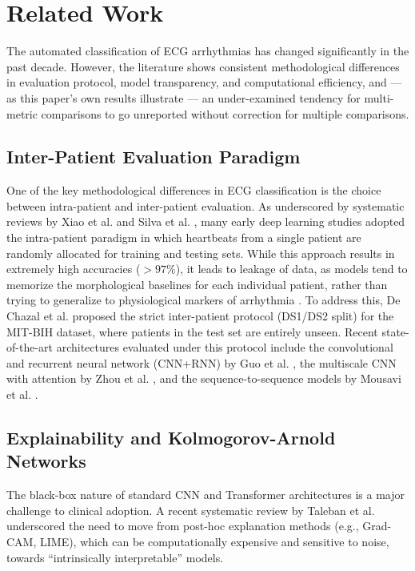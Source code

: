 \documentclass[journal,twoside,web]{ieeecolor}
\begin{document}
\section{Related Work}
\label{sec:related_work}

The automated classification of ECG arrhythmias has changed significantly in the past decade. However, the literature shows consistent methodological differences in evaluation protocol, model transparency, and computational efficiency, and --- as this paper's own results illustrate --- an under-examined tendency for multi-metric comparisons to go unreported without correction for multiple comparisons.

\subsection{Inter-Patient Evaluation Paradigm}
One of the key methodological differences in ECG classification is the choice between intra-patient and inter-patient evaluation. As underscored by systematic reviews by Xiao et al. \cite{xiao_deep_2023} and Silva et al. \cite{silva_systematic_2025}, many early deep learning studies adopted the intra-patient paradigm in which heartbeats from a single patient are randomly allocated for training and testing sets. While this approach results in extremely high accuracies ($> 97\%$), it leads to leakage of data, as models tend to memorize the morphological baselines for each individual patient, rather than trying to generalize to physiological markers of arrhythmia \cite{bahrami_investigation_2025}. To address this, De Chazal et al. \cite{chazal_automatic_2004} proposed the strict inter-patient protocol (DS1/DS2 split) for the MIT-BIH dataset, where patients in the test set are entirely unseen. Recent state-of-the-art architectures evaluated under this protocol include the convolutional and recurrent neural network (CNN+RNN) by Guo et al. \cite{guo_inter-patient_2019}, the multiscale CNN with attention by Zhou et al. \cite{zhou_inter-patient_2024}, and the sequence-to-sequence models by Mousavi et al. \cite{mousavi_inter-_2019}.

\subsection{Explainability and Kolmogorov-Arnold Networks}
The black-box nature of standard CNN and Transformer architectures is a major challenge to clinical adoption. A recent systematic review by Taleban et al. \cite{taleban_explainable_2026} underscored the need to move from post-hoc explanation methods (e.g., Grad-CAM, LIME), which can be computationally expensive and sensitive to noise, towards ``intrinsically interpretable'' models.
\end{document}
